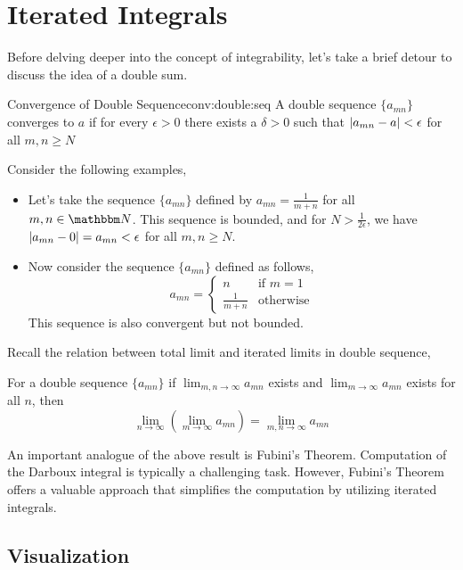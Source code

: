 \documentclass[../Analysis-3.tex]{subfiles}
\begin{document}
\section{Iterated Integrals}

Before delving deeper into the concept of integrability, let's take a brief detour to discuss the idea of a double sum.

\begin{Def}{Convergence of Double Sequence}{conv:double:seq}
  A double sequence $ \{a_{mn}\} $ converges to $ a $ if for every $ \epsilon > 0 $ there exists a $ \delta > 0 $ such that $ \abs{a_{mn} - a} < \epsilon $ for all $ m,n \geq N $
\end{Def}

Consider the following examples,
\begin{Eg}{}{}
  \begin{itemize}
    \item Let's take the sequence $ \{a_{mn}\} $ defined by $ a_{mn} = \frac 1{m+n} $ for all $ m,n \in \N $. This sequence is bounded, and for $ N > \frac 1{2\epsilon} $, we have $ \abs{a_{mn} - 0} = a_{mn} < \epsilon $ for all $ m,n \geq N $.
    \item Now consider the sequence $ \{a_{mn}\} $ defined as follows,
          \[  a_{mn} = \begin{cases}
              n            & \text{if } m=1   \\
              \frac 1{m+n} & \text{otherwise}
            \end{cases}  \]
          This sequence is also convergent but not bounded.
  \end{itemize}
\end{Eg}

Recall the relation between total limit and iterated limits in double sequence,
\begin{ThmN}{}{}
  For a double sequence $ \{a_{mn}\} $ if $ \lim_{m,n \to \infty} a_{mn} $ exists and $ \lim_{m \to \infty} a_{mn} $ exists for all $ n $, then
  \[  \lim_{n \to \infty}\left( \lim_{m \to \infty} a_{mn} \right) = \lim_{m,n \to \infty} a_{mn}  \]
\end{ThmN}
An important analogue of the above result is Fubini's Theorem. Computation of the Darboux integral is typically a challenging task. However, Fubini's Theorem offers a valuable approach that simplifies the computation by utilizing iterated integrals.

\subsection*{Visualization}
\end{document}
